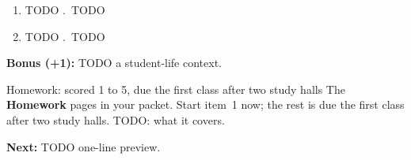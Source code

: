 \documentclass[aspectratio=169, 11pt]{beamer}
\begin{document}
\begin{frame}[t, plain]
  \begin{enumerate}\setlength{\itemsep}{3pt}
    \item TODO \qquad{}.\ TODO
    \setcounter{enumi}{2}
    \item TODO \qquad{}.\ TODO
  \end{enumerate}
  {\small\textbf{Bonus (+1):} TODO a student-life context.}
\end{frame}

\begin{frame}[t, plain]
  \begin{block}{Homework: scored 1 to 5, due the first class after two study halls}
    The \textbf{Homework} pages in your packet. Start item~1 now; the rest is due the first class
    after two study halls. TODO: what it covers.
  \end{block}
  \vspace{4pt}
  \textbf{Next:} TODO one-line preview.
\end{frame}
\end{document}
